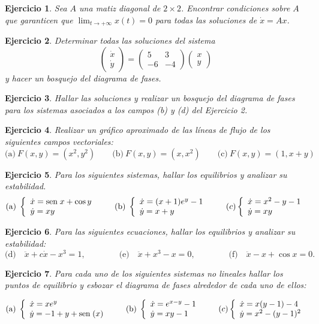 \documentclass[11pt,a4paper,pdftex]{amsart}
\newtheorem{ej}{Ejercicio}%
\numberwithin{equation}{section}%
\newcommand{\bej}[1]{\begin{ej}\rm{#1}}
\newcommand{\eej}{\end{ej}\vspace{-0.2cm}}
\newcommand{\ba}{\begin{array}}
\newcommand{\ea}{\end{array}}
\newcommand{\0}{\mathbb O}
\newcommand{\8}{\infty}
\newcommand{\sen}[1]{\mbox{sen}\;{#1}}
\begin{document}
\bej Sea $A$ una matiz diagonal de $2\times 2$. Encontrar condiciones
sobre $A$ que garanticen que $\lim_{t\to +\infty} x(t)=0$ para todas las 
soluciones de $\dot{x}=Ax$.
\eej


\bej Determinar todas las soluciones del sistema
$$\left(\begin{aligned}\dot{x}\\ \dot{y}\end{aligned}\right)=
\left(\begin{array}{rr}5 & 3\\-6 & -4\end{array}\right)
\left(\begin{aligned}x\\ y\end{aligned}\right)$$ y hacer un
bosquejo del diagrama de fases.
\eej

\bej Hallar las soluciones y realizar un bosquejo del diagrama de fases para 
los sistemas asociados a los campos (b) y (d) del Ejercicio 2.
\eej

\bej Realizar un {gráfico aproximado} de las líneas de flujo de los siguientes campos vectoriales:
\[%
\text{(a)} \ F(x,y)=(x^{2},y^{2}) \qquad \text{(b)} \ F(x,y)=(x,x^{2}) \qquad
 \text{(c)} \ F\left(  x,y\right)
=\left(  1,x+y\right)
\]
\eej

\bej Para los siguientes  sistemas, hallar los equilibrios y analizar su estabilidad.
$$\text{(a)}\; \left\{\ba{l}\dot{x}=\sen x+\cos y\\ \dot{y}=xy \ea \right. \qquad
\text{(b)}\; \left\{\ba{l}\dot{x}=(x+1)e^y-1\\ \dot{y}=x+ y \ea \right.
\qquad \text(c)\left\{\ba{l}\dot x=x^2-y-1\\ \dot y = xy\ea\right.$$
\eej

\bej Para las siguientes  ecuaciones, hallar los equilibrios y analizar su estabilidad:
$$\text{(d)}\quad\ddot x+c\dot x-x^3=1,
\quad\quad \qquad\text{(e)}\quad\ddot x+x^3-x=0,
\quad       \quad \qquad\text{(f)}\quad\ddot x-x+\cos x=0.    $$
\eej

\bej Para cada uno de los siguientes sistemas no lineales hallar los puntos de equilibrio y { esbozar} el diagrama de fases
alrededor de cada uno de ellos:

$$\text{(a)}\; \left\{\ba{l}\dot{x}=x e^y\\ \dot{y}=-1+y+\sen(x) \ea \right. \qquad
\text{(b)}\; \left\{\ba{l}\dot{x}=e^{x-y}-1\\ \dot{y}=x y-1 \ea \right.
\qquad \text(c)\left\{\ba{l}\dot x=x(y-1)-4\\ \dot y = x^2-(y-1)^2\ea\right.$$
\eej
\end{document}
